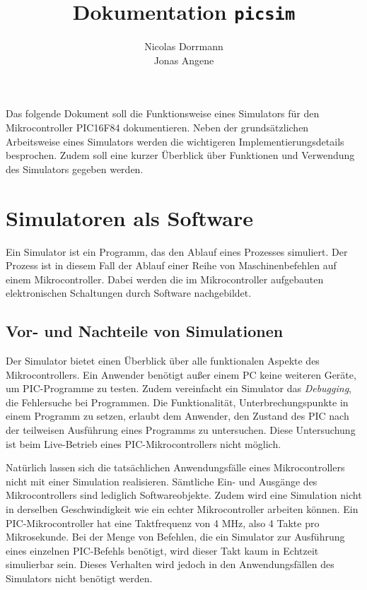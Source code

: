 \documentclass[a4paper]{article}
\title{\textbf{Dokumentation \texttt{picsim}}}
\author{
    Nicolas Dorrmann \\
    Jonas Angene
}
\begin{document}
\maketitle

Das folgende Dokument soll die Funktionsweise eines Simulators für den Mikrocontroller PIC16F84 dokumentieren.
Neben der grundsätzlichen Arbeitsweise eines Simulators werden die wichtigeren Implementierungsdetails besprochen.
Zudem soll eine kurzer Überblick über Funktionen und Verwendung des Simulators gegeben werden.

\section{Simulatoren als Software}

Ein Simulator ist ein Programm, das den Ablauf eines Prozesses simuliert.
Der Prozess ist in diesem Fall der Ablauf einer Reihe von Maschinenbefehlen auf einem Mikrocontroller.
Dabei werden die im Mikrocontroller aufgebauten elektronischen Schaltungen durch Software nachgebildet.

\subsection{Vor- und Nachteile von Simulationen}

Der Simulator bietet einen Überblick über alle funktionalen Aspekte des Mikrocontrollers.
Ein Anwender benötigt außer einem PC keine weiteren Geräte, um PIC-Programme zu testen.
Zudem vereinfacht ein Simulator das \textit{Debugging}, die Fehlersuche bei Programmen.
Die Funktionalität, Unterbrechungspunkte in einem Programm zu setzen, erlaubt dem Anwender, den Zustand des PIC nach der teilweisen Ausführung eines Programms zu untersuchen.
Diese Untersuchung ist beim Live-Betrieb eines PIC-Mikrocontrollers nicht möglich.

Natürlich lassen sich die tatsächlichen Anwendungsfälle eines Mikrocontrollers nicht mit einer Simulation realisieren.
Sämtliche Ein- und Ausgänge des Mikrocontrollers sind lediglich Softwareobjekte.
Zudem wird eine Simulation nicht in derselben Geschwindigkeit wie ein echter Mikrocontroller arbeiten können.
Ein PIC-Mikrocontroller hat eine Taktfrequenz von 4 MHz, also 4 Takte pro Mikrosekunde.
Bei der Menge von Befehlen, die ein Simulator zur Ausführung eines einzelnen PIC-Befehls benötigt, wird dieser Takt kaum in Echtzeit simulierbar sein.
Dieses Verhalten wird jedoch in den Anwendungsfällen des Simulators nicht benötigt werden.
\end{document}
